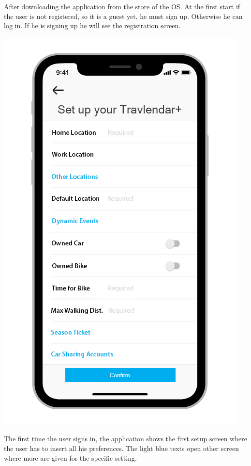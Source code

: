 After downloading the application from the store of the OS. At the first start if the user is not registered, so it is a guest yet, he must sign up. Otherwise he can log in. If he is signing up he will see the registration screen.
\begin{center}
\includegraphics[scale=2.4]{MainMatter/images/ui/firstsetup}
\end{center}
The first time the user signs in, the application shows the first setup screen where the user has to insert all his preferences. The light blue texts open other screen where more are given for the specific setting. \\\
